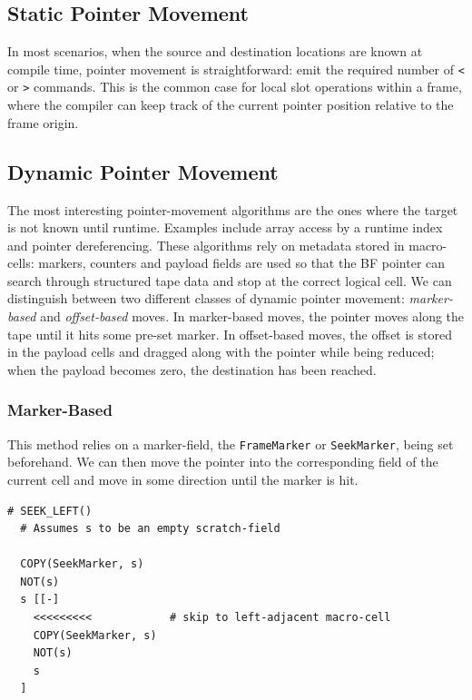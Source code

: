 \subsection{Static Pointer Movement}
\label{sec:compilation:staticmove}
In most scenarios, when the source and destination locations are known at compile time, pointer movement is straightforward: emit the required number of \texttt{<} or \texttt{>} commands. This is the common case for local slot operations within a frame, where the compiler can keep track of the current pointer position relative to the frame origin.

\subsection{Dynamic Pointer Movement}
\label{sec:compilation:dynamicmove}
The most interesting pointer-movement algorithms are the ones where the target is not known until runtime. Examples include array access by a runtime index and pointer dereferencing. These algorithms rely on metadata stored in macro-cells: markers, counters and payload fields are used so that the BF pointer can search through structured tape data and stop at the correct logical cell. We can distinguish between two different classes of dynamic pointer movement: \emph{marker-based} and \emph{offset-based} moves. In marker-based moves, the pointer moves along the tape until it hits some pre-set marker. In offset-based moves, the offset is stored in the payload cells and dragged along with the pointer while being reduced; when the payload becomes zero, the destination has been reached.

\subsubsection{Marker-Based}
\label{sec:compilation:dynamicmove:marker}
This method relies on a marker-field, the \texttt{FrameMarker} or \texttt{SeekMarker}, being set beforehand. We can then move the pointer into the corresponding field of the current cell and move in some direction until the marker is hit.

\vspace{0.5cm}\noindent\begin{minipage}{\linewidth}
\begin{lstlisting}[style=brainfuck]
  # SEEK_LEFT()
  # Assumes s to be an empty scratch-field

  COPY(SeekMarker, s)
  NOT(s)
  s [[-]
    <<<<<<<<<            # skip to left-adjacent macro-cell
    COPY(SeekMarker, s)
    NOT(s)
    s
  ]
\end{lstlisting}
\end{minipage}

